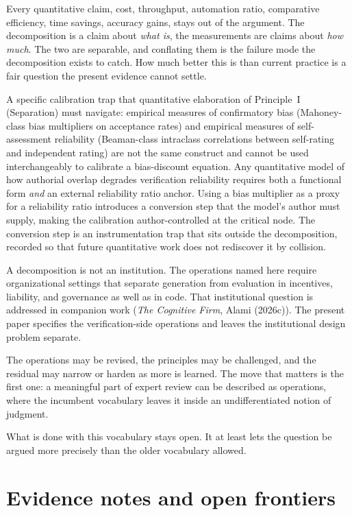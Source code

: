 \documentclass[
  11pt,
]{article}
\begin{document}
Every quantitative claim, cost, throughput, automation ratio,
comparative efficiency, time savings, accuracy gains, stays out of the
argument. The decomposition is a claim about \emph{what is}, the
measurements are claims about \emph{how much}. The two are separable, and
conflating them is the failure mode the decomposition exists to catch. How
much better this is than current practice is a fair question the present
evidence cannot settle.

A specific calibration trap that quantitative elaboration of Principle~I
(Separation) must navigate: empirical measures of confirmatory bias
(Mahoney-class bias multipliers on acceptance rates) and empirical
measures of self-assessment reliability (Beaman-class intraclass
correlations between self-rating and independent rating) are not the same
construct and cannot be used interchangeably to calibrate a bias-discount
equation. Any quantitative model of how authorial overlap degrades
verification reliability requires both a functional form \emph{and} an
external reliability ratio anchor. Using a bias multiplier as a proxy for
a reliability ratio introduces a conversion step that the model's author
must supply, making the calibration author-controlled at the critical
node. The conversion step is an instrumentation trap that sits outside the
decomposition, recorded so that future quantitative work does not
rediscover it by collision.

A decomposition is not an institution. The operations named here require
organizational settings that separate generation from evaluation in
incentives, liability, and governance as well as in code. That
institutional question is addressed in companion work (\emph{The Cognitive
Firm}, Alami (2026c)). The present paper specifies the verification-side
operations and leaves the institutional design problem separate.

The operations may be revised, the principles may be challenged, and the
residual may narrow or harden as more is learned. The move that matters is
the first one: a meaningful part of expert review can be described as
operations, where the incumbent vocabulary leaves it inside an
undifferentiated notion of judgment.

What is done with this vocabulary stays open. It at least lets the
question be argued more precisely than the older vocabulary allowed.

\section{Evidence notes and open
frontiers}\label{evidence-notes-and-open-frontiers}
\end{document}
